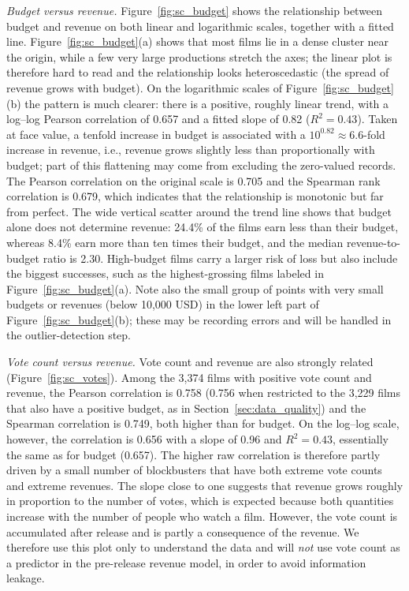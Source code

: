 \documentclass[conference]{IEEEtran}
\begin{document}
\textit{Budget versus revenue.}
Figure~\ref{fig:sc_budget} shows the relationship between budget and revenue on both linear and logarithmic scales, together with a fitted line. Figure~\ref{fig:sc_budget}(a) shows that most films lie in a dense cluster
near the origin, while a few very large productions stretch the axes; the
linear plot is therefore hard to read and the relationship looks
heteroscedastic (the spread of revenue grows with budget). On the
logarithmic scales of Figure~\ref{fig:sc_budget}(b) the pattern is much
clearer: there is a positive, roughly linear trend, with a log--log
Pearson correlation of 0.657 and a fitted slope of 0.82 ($R^2 = 0.43$).
Taken at face value, a tenfold increase in budget is associated with a
$10^{0.82}\approx 6.6$-fold increase in revenue, i.e., revenue grows
slightly less than proportionally with budget; part of this flattening may
come from excluding the zero-valued records. The Pearson correlation on
the original scale is 0.705 and the Spearman rank correlation is 0.679,
which indicates that the relationship is monotonic but far from perfect.
The wide vertical scatter around the trend line shows that budget alone
does not determine revenue: 24.4\% of the films earn less than their
budget, whereas 8.4\% earn more than ten times their budget, and the
median revenue-to-budget ratio is 2.30. High-budget films carry a larger
risk of loss but also include the biggest successes, such as the
highest-grossing films labeled in Figure~\ref{fig:sc_budget}(a). Note also
the small group of points with very small budgets or revenues (below
10,000 USD) in the lower left part of Figure~\ref{fig:sc_budget}(b); these
may be recording errors and will be handled in the outlier-detection
step.
 
\textit{Vote count versus revenue.}
Vote count and revenue are also strongly related (Figure~\ref{fig:sc_votes}).
Among the 3,374 films with positive vote count and revenue, the Pearson
correlation is 0.758 (0.756 when restricted to the 3,229 films that
also have a positive budget, as in Section~\ref{sec:data_quality}) and the Spearman correlation is 0.749, both higher
than for budget. On the log--log scale, however, the correlation is 0.656
with a slope of 0.96 and $R^2 = 0.43$, essentially the same as for budget
(0.657). The higher raw correlation is therefore partly driven by a small
number of blockbusters that have both extreme vote counts and extreme
revenues. The slope close to one suggests that revenue grows roughly in
proportion to the number of votes, which is expected because both
quantities increase with the number of people who watch a film. However,
the vote count is accumulated after release and is partly a consequence of
the revenue. We therefore use this plot only to understand the data and
will \emph{not} use vote count as a predictor in the pre-release revenue
model, in order to avoid information leakage.
 
\end{document}
